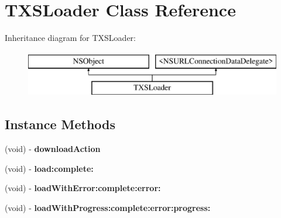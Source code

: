 \hypertarget{interface_t_x_s_loader}{}\section{T\+X\+S\+Loader Class Reference}
\label{interface_t_x_s_loader}
Inheritance diagram for T\+X\+S\+Loader\+:\begin{figure}[H]
\begin{center}
\leavevmode
\includegraphics[height=2.000000cm]{interface_t_x_s_loader}
\end{center}
\end{figure}
\subsection*{Instance Methods}
\begin{DoxyCompactItemize}
\item 
\hypertarget{interface_t_x_s_loader_a3a8e12cfb8897cf985436e0af2559070}{}(void) -\/ {\bfseries download\+Action}\label{interface_t_x_s_loader_a3a8e12cfb8897cf985436e0af2559070}

\item 
\hypertarget{interface_t_x_s_loader_ac217fb00257e381f59449df43372d2c1}{}(void) -\/ {\bfseries load\+:complete\+:}\label{interface_t_x_s_loader_ac217fb00257e381f59449df43372d2c1}

\item 
\hypertarget{interface_t_x_s_loader_a050356bb5ce967e208bc4f939f327537}{}(void) -\/ {\bfseries load\+With\+Error\+:complete\+:error\+:}\label{interface_t_x_s_loader_a050356bb5ce967e208bc4f939f327537}

\item 
\hypertarget{interface_t_x_s_loader_ac96aa60a90210af2a31efa7523400eaf}{}(void) -\/ {\bfseries load\+With\+Progress\+:complete\+:error\+:progress\+:}\label{interface_t_x_s_loader_ac96aa60a90210af2a31efa7523400eaf}

\end{DoxyCompactItemize}
